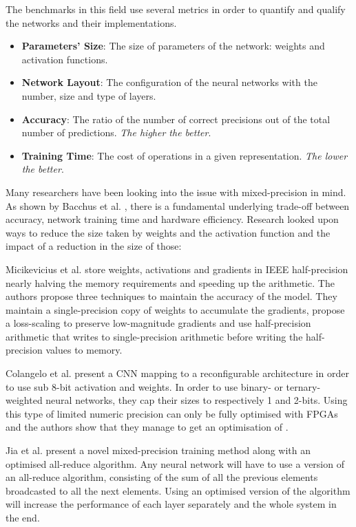 The benchmarks in this field use several metrics in order to quantify and qualify the networks and their implementations.
\begin{itemize}
	\item \textbf{Parameters' Size}: The size of parameters of the network: weights and activation functions.
	\item \textbf{Network Layout}: The configuration of the neural networks with the number, size and type of layers.
	\item \textbf{Accuracy}: The ratio of the number of correct precisions out of the total number of predictions. \emph{The higher the better}.
	\item \textbf{Training Time}: The cost of operations in a given representation. \emph{The lower the better}.
\end{itemize}

Many researchers have been looking into the issue with mixed-precision in mind. As shown by Bacchus et al. \cite{Bacchus2020}, there is a fundamental underlying trade-off between accuracy, network training time and hardware efficiency. Research looked upon ways to reduce the size taken by weights and the activation function and the impact of a reduction in the size of those:

Micikevicius et al. \cite{Micikevicius2017} store weights, activations and gradients in IEEE half-precision nearly halving the memory requirements and speeding up the arithmetic. The authors propose three techniques to maintain the accuracy of the model. They maintain a single-precision copy of weights to accumulate the gradients, propose a loss-scaling to preserve low-magnitude gradients and use half-precision arithmetic that writes to single-precision arithmetic before writing the half-precision values to memory.

Colangelo et al. \cite{Colangelo2018} present a CNN mapping to a reconfigurable architecture in order to use sub 8-bit activation and weights. In order to use binary- or ternary-weighted neural networks, they cap their sizes to respectively 1 and 2-bits. Using this type of limited numeric precision can only be fully optimised with FPGAs and the authors show that they manage to get an optimisation of .

Jia et al. \cite{Jia2018} present a novel mixed-precision training method along with an optimised all-reduce algorithm. Any neural network will have to use a version of an all-reduce algorithm, consisting of the sum of all the previous elements broadcasted to all the next elements. Using an optimised version of the algorithm will increase the performance of each layer separately and the whole system in the end.

